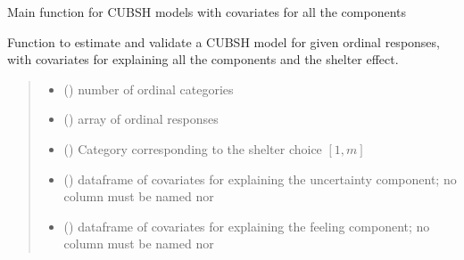 \documentclass[letterpaper,10pt,english]{sphinxmanual}
\begin{document}
\begin{fulllineitems}
\label{\detokenize{cubmods:cubmods.cubsh_ywx.mle}}
\pysigstartsignatures
{}
\pysigstopsignatures
\sphinxAtStartPar
Main function for CUBSH models with covariates for all the components

\sphinxAtStartPar
Function to estimate and validate a CUBSH model for given ordinal responses, with covariates for
explaining all the components and the shelter effect.
\begin{quote}\begin{description}
\begin{itemize}
\item {} 
\sphinxAtStartPar
{} () \textendash{} number of ordinal categories

\item {} 
\sphinxAtStartPar
{} () \textendash{} array of ordinal responses

\item {} 
\sphinxAtStartPar
{} () \textendash{} Category corresponding to the shelter choice \([1,m]\)

\item {} 
\sphinxAtStartPar
{} () \textendash{} dataframe of covariates for explaining the uncertainty component;
no column must be named  nor 

\item {} 
\sphinxAtStartPar
{} () \textendash{} dataframe of covariates for explaining the feeling component;
no column must be named  nor 


\end{itemize}
\end{description}
\end{quote}
\end{fulllineitems}
\end{document}
